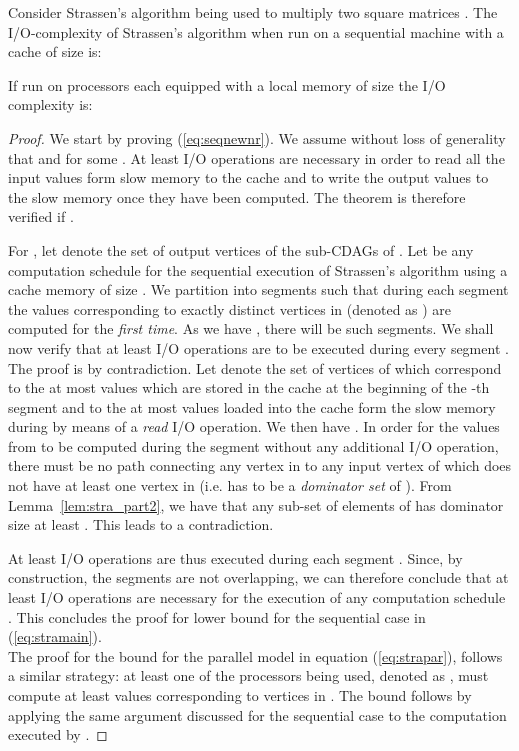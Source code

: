 \documentclass[a4paper,UKenglish]{lipics-v2016}
\newcommand{\io }{I/O }
\begin{document}
\begin{theorem}[Lower bound \io complexity Strassen's algorithm]
\label{thm:genstrass}
Consider Strassen's algorithm being used to multiply two square matrices . 
The I/O-complexity of Strassen's algorithm when run on a sequential machine with a cache of size  is:

If run on  processors each equipped with a local memory of size  the \io complexity is:

\end{theorem}
\begin{proof}
We start by proving (\ref{eq:seqnewnr}). We assume without loss of generality that  and   for some . At least  \io operations are necessary in order to read all the  input values form slow memory to the cache and to write the  output values to the slow memory once they have been computed. The theorem is therefore verified if . 

For , let  denote the set of output vertices of the  sub-CDAGs  of .
	Let  be any computation schedule for the sequential execution of Strassen's algorithm using a cache memory of size . 
	We partition  into segments such that during each segment  the values corresponding to exactly  distinct vertices in  (denoted as ) are computed for the \emph{first time}. As we have , there will be  such segments.
We shall now verify that at least  \io operations are to be executed during every segment . The proof is by contradiction.   
	 Let  denote the set of vertices of  which correspond to the at most  values which are stored in the cache at the beginning of the -th segment and to the at most  values loaded into the cache form the slow memory during  by means of a \emph{read} \io operation. We then have .
	 In order for the  values from  to be computed during the segment without any additional \io operation, there must be no path connecting any vertex in  to any input vertex of  which does not have at least one vertex in  (i.e.  has to be a \emph{dominator set} of ). From Lemma~\ref{lem:stra_part2}, we have that any sub-set of  elements of  has dominator size at least . This leads to a contradiction.
	
	At least  \io operations are thus executed during each segment . Since, by construction, the  segments are not overlapping, we can therefore conclude that at least  \io operations are necessary for the execution of any computation schedule . This concludes the proof for lower bound for the sequential case in (\ref{eq:stramain}). \\
	The proof for the bound for the parallel model in equation (\ref{eq:strapar}), follows a similar strategy: at least one of the  processors being used, denoted as , must compute at least  values corresponding to vertices in . The bound follows by applying the same argument discussed for the sequential case to the computation executed by . 
	\end{proof}
\end{document}
